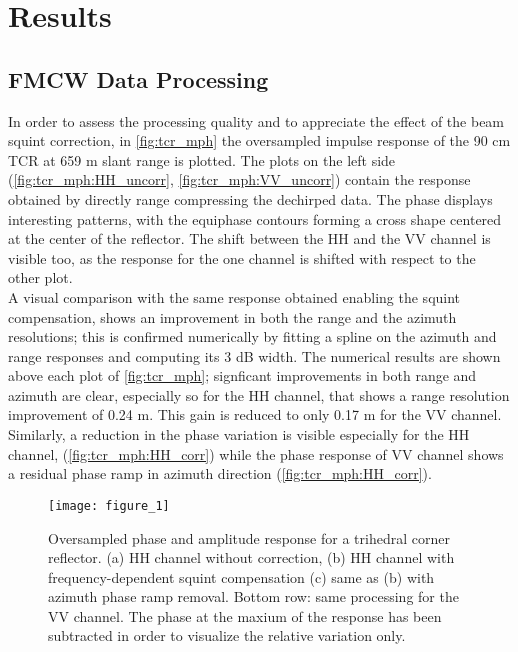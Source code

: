 \section{Results}\label{sec:results}
\subsection{FMCW Data Processing}\label{sec:res_SLC}
In order to assess the processing quality and to appreciate the effect of the beam squint correction, in  \autoref{fig:tcr_mph} the oversampled impulse response of the 90 cm TCR at 659 m slant range is plotted. The plots on the left side (\autoref{fig:tcr_mph:HH_uncorr}, \autoref{fig:tcr_mph:VV_uncorr}) contain the response obtained by directly range compressing the dechirped data. The phase displays interesting patterns, with the equiphase contours forming a cross shape centered at the center of the reflector. The shift between the HH and the VV channel is visible too, as the response for the one channel is shifted with respect to the other plot.\\ A visual comparison with the same response obtained enabling the squint compensation, shows an improvement in both the range and the azimuth resolutions; this is confirmed numerically by fitting a spline on the azimuth and range responses and computing its 3 dB width. The numerical results are shown above each plot of \autoref{fig:tcr_mph}; signficant improvements in both range and azimuth are clear, especially so for the HH channel, that shows a range resolution improvement of 0.24 m. This gain is reduced to only 0.17 m for the VV channel.\\ Similarly, a reduction in the phase variation is visible especially for the HH channel, (\autoref{fig:tcr_mph:HH_corr}) while the phase response of VV channel shows a residual phase ramp in azimuth direction (\autoref{fig:tcr_mph:HH_corr}).
\def\chutzepref{20160914_145059}
\begin{figure*}[ht]
	\centering
	\texttt{[image: figure\_1]}
	\caption{Oversampled phase and amplitude response for a trihedral corner reflector. (a) HH channel without correction, (b) HH channel with frequency-dependent squint compensation (c) same as (b) with azimuth phase ramp removal. Bottom row: same processing for the VV channel.
	The phase at the maxium of the response has been subtracted in order to visualize the relative variation only.}
	\label{fig:tcr_mph}
\end{figure*}
